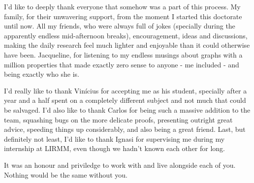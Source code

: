 I'd like to deeply thank everyone that somehow was a part of this process.
My family, for their unwavering support, from the moment I started this doctorate until now.
All my friends, who were always full of jokes (specially during the apparently endless mid-afternoon breaks), encouragement, ideas and discussions, making the daily research feel much lighter and enjoyable than it could otherwise have been.
Jacqueline, for listening to my endless musings about graphs with a million properties that made exactly zero sense to anyone - me included - and being exactly who she is.

I'd really like to thank Vinícius for accepting me as his student, specially after a year and a half spent on a completely different subject and not much that could be salvaged.
I'd also like to thank Carlos for being such a massive addition to the team, squashing bugs on the more delicate proofs, presenting outright great advice, speeding things up considerably, and also being a great friend.
Last, but definitely not least, I'd like to thank Ignasi for supervising me during my internship at LIRMM, even though we hadn't known each other for long.

It was an honour and priviledge to work with and live alongside each of you.
Nothing would be the same without you.
